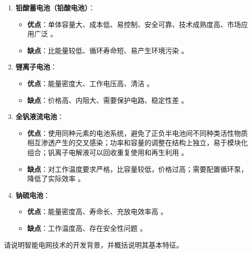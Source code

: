 \begin{solution}
\begin{enumerate}
\item \textbf{铅酸蓄电池（铅酸电池）}：
\begin{itemize}
\item \textbf{优点}：单体容量大、成本低、易控制、安全可靠、技术成熟度高、市场应用广泛 。
\item \textbf{缺点}：比能量较低、循环寿命短、易产生环境污染 。
\end{itemize}
\item \textbf{锂离子电池}：
\begin{itemize}
\item \textbf{优点}：能量密度大、工作电压高、清洁 。
\item \textbf{缺点}：价格高、内阻大、需要保护电路、稳定性差 。
\end{itemize}
\item \textbf{全钒液流电池}：
\begin{itemize}
\item \textbf{优点}：使用同种元素的电池系统，避免了正负半电池间不同种类活性物质相互渗透产生的交叉感染；功率和容量的调整在结构上独立，易于模块化组合；钒离子电解液可以回收重复使用和再生利用 。
\item \textbf{缺点}：对工作温度要求严格，比容量较低，价格过高；需要配置循环泵，降低了实际效率 。
\end{itemize}
\item \textbf{钠硫电池}：
\begin{itemize}
\item \textbf{优点}：能量密度高、寿命长、充放电效率高 。
\item \textbf{缺点}：工作温度高、存在安全性问题 。
\end{itemize}
\end{enumerate}
\end{solution}

\begin{problem}\label{exer:think_03_wind_11}
请说明智能电网技术的开发背景，并概括说明其基本特征。
\end{problem}

